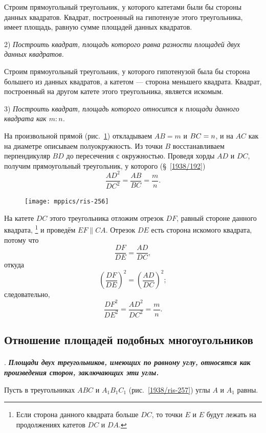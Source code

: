 \documentclass[oneside]{book}
\begin{document}
Строим прямоугольный треугольник, у которого катетами были бы стороны данных квадратов.
Квадрат, построенный на гипотенузе этого треугольника, имеет площадь, равную сумме площадей данных квадратов.

2) \emph{Построить квадрат, площадь которого равна разности площадей двух данных квадратов.}

Строим прямоугольный треугольник, у которого гипотенузой была бы сторона большего из данных квадратов, а катетом — сторона меньшего квадрата.
Квадрат, построенный на другом катете этого треугольника, является искомым.

3) \emph{Построить квадрат, площадь которого относится к площади данного квадрата как $m:n$.}

На произвольной прямой (рис.~\ref{1938/ris-256}) откладываем $AB=m$ и $BC\z=n$, и на $AC$ как на диаметре описываем полуокружность.
Из точки $B$ восстанавливаем перпендикуляр $BD$ до пересечения с окружностью.
Проведя хорды $AD$ и $DC$, получим прямоугольный треугольник, у которого (§~\ref{1938/192})
\[\frac{AD^2}{DC^2}=\frac{AB}{BC}=\frac mn.\]

\begin{figure}
\vskip-4mm
\centering
\texttt{[image: mppics/ris-256]}
\caption{}\label{1938/ris-256}
\end{figure}

\noindent
На катете $DC$ этого треугольника отложим отрезок $DF$, равный стороне данного квадрата,%
\footnote{Если сторона данного квадрата больше $DC$, то точки $E$ и $E$ будут лежать на продолжениях катетов $DC$ и $DA$.}
и проведём $EF\parallel CA$.
Отрезок $DE$ есть сторона искомого квадрата, потому что
\[
\frac{DF}{DE}=\frac{AD}{DC},\]
откуда
\[\left(\frac{DF}{DE}\right)^2=\left(\frac{AD}{DC}\right)^2;\]
следовательно,
\[\frac{DF^2}{DE^2}=\frac{AD^2}{DC^2}=\frac mn.\]

\subsection*{Отношение площадей подобных многоугольников}

\paragraph{}\label{1938/259}
.
\textbf{\emph{Площади двух треугольников, имеющих по равному углу, относятся как произведения сторон, заключающих эти углы.}}

Пусть в треугольниках $ABC$ и $A_1B_1C_1$ (рис.~\ref{1938/ris-257}) углы $A$ и $A_1$ равны.
\end{document}
